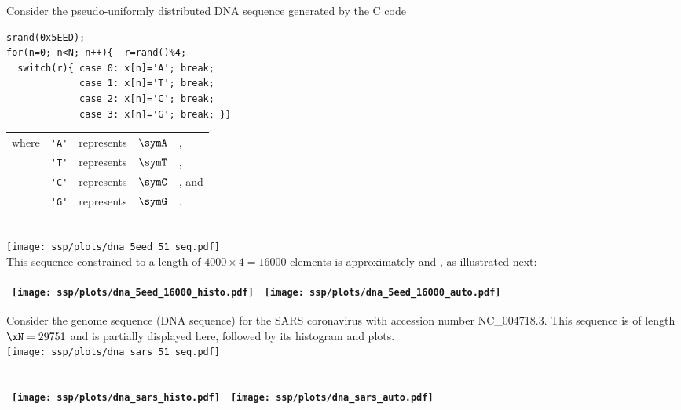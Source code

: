 \begin{example}
\label{ex:dna_5eed}
Consider the pseudo-uniformly distributed DNA sequence generated by the C code\footnotemark 
\\\begin{minipage}{85mm}%
\begin{lstlisting}
srand(0x5EED);
for(n=0; n<N; n++){  r=rand()%4;
  switch(r){ case 0: x[n]='A'; break;
             case 1: x[n]='T'; break;
             case 2: x[n]='C'; break;
             case 3: x[n]='G'; break; }}
\end{lstlisting}
\end{minipage}%
\hspace{10mm}%
\begin{tabular}{lclcl}
  where & \lstinline!'A'! &represents& $\symA$ &,
     \\ & \lstinline!'T'! &represents& $\symT$ &,
     \\ & \lstinline!'C'! &represents& $\symC$ &, and
     \\ & \lstinline!'G'! &represents& $\symG$ &.
\end{tabular}
  \\\texttt{[image: ssp/plots/dna\_5eed\_51\_seq.pdf]}\\
This sequence constrained to a length of $4000\times4=16000$ elements is approximately  and , 
as illustrated next:
  \\\begin{tabular}{|>{\scs}c|>{\scs}c|}
       \hline
       \texttt{[image: ssp/plots/dna\_5eed\_16000\_histo.pdf]}%
      &\texttt{[image: ssp/plots/dna\_5eed\_16000\_auto.pdf]}%
     \\\hline
  \end{tabular}
\end{example}

\begin{example}
\label{ex:dna_sars}
Consider the genome sequence (DNA sequence) for the SARS coronavirus with  accession number NC\_004718.3. %
This sequence is of length $\xN=29751$ and is partially displayed here, followed by its histogram and 
 plots.
  \\\texttt{[image: ssp/plots/dna\_sars\_51\_seq.pdf]}\\
     \\\begin{tabular}{|>{\scs}c|>{\scs}c|}
          \hline
          \texttt{[image: ssp/plots/dna\_sars\_histo.pdf]}%
         &\texttt{[image: ssp/plots/dna\_sars\_auto.pdf]}
        \\\hline
     \end{tabular}
\end{example}

